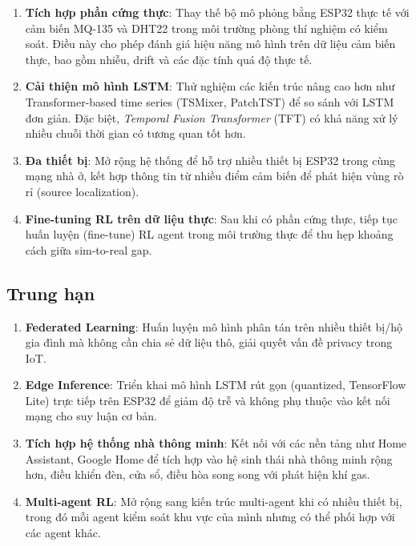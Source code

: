 \begin{enumerate}
  \item \textbf{Tích hợp phần cứng thực}: Thay thế bộ mô phỏng bằng ESP32 thực tế với cảm biến MQ-135 và DHT22 trong môi trường phòng thí nghiệm có kiểm soát. Điều này cho phép đánh giá hiệu năng mô hình trên dữ liệu cảm biến thực, bao gồm nhiễu, drift và các đặc tính quá độ thực tế.

  \item \textbf{Cải thiện mô hình LSTM}: Thử nghiệm các kiến trúc nâng cao hơn như Transformer-based time series (TSMixer, PatchTST) để so sánh với LSTM đơn giản. Đặc biệt, \textit{Temporal Fusion Transformer} (TFT) có khả năng xử lý nhiều chuỗi thời gian có tương quan tốt hơn.

  \item \textbf{Đa thiết bị}: Mở rộng hệ thống để hỗ trợ nhiều thiết bị ESP32 trong cùng mạng nhà ở, kết hợp thông tin từ nhiều điểm cảm biến để phát hiện vùng rò rỉ (source localization).

  \item \textbf{Fine-tuning RL trên dữ liệu thực}: Sau khi có phần cứng thực, tiếp tục huấn luyện (fine-tune) RL agent trong môi trường thực để thu hẹp khoảng cách giữa sim-to-real gap.
\end{enumerate}

\subsection{Trung hạn}

\begin{enumerate}
  \item \textbf{Federated Learning}: Huấn luyện mô hình phân tán trên nhiều thiết bị/hộ gia đình mà không cần chia sẻ dữ liệu thô, giải quyết vấn đề privacy trong IoT.

  \item \textbf{Edge Inference}: Triển khai mô hình LSTM rút gọn (quantized, TensorFlow Lite) trực tiếp trên ESP32 để giảm độ trễ và không phụ thuộc vào kết nối mạng cho suy luận cơ bản.

  \item \textbf{Tích hợp hệ thống nhà thông minh}: Kết nối với các nền tảng như Home Assistant, Google Home để tích hợp vào hệ sinh thái nhà thông minh rộng hơn, điều khiển đèn, cửa sổ, điều hòa song song với phát hiện khí gas.

  \item \textbf{Multi-agent RL}: Mở rộng sang kiến trúc multi-agent khi có nhiều thiết bị, trong đó mỗi agent kiểm soát khu vực của mình nhưng có thể phối hợp với các agent khác.
\end{enumerate}

